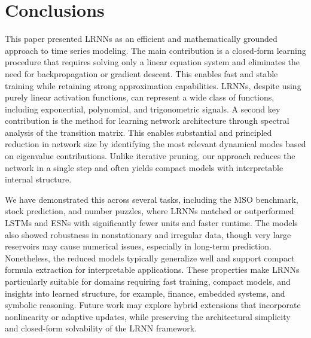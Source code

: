 \documentclass{sn-jnl}
\theoremstyle{definition}
\begin{document}
\section{Conclusions}\label{conclude}

This paper presented LRNNs as an efficient and mathematically grounded approach
to time series modeling. The main contribution is a closed-form learning
procedure that requires solving only a linear equation system and eliminates the
need for backpropagation or gradient descent. This enables fast and stable
training while retaining strong approximation capabilities. LRNNs, despite using
purely linear activation functions, can represent a wide class of functions,
including exponential, polynomial, and trigonometric signals. A second key
contribution is the method for learning network architecture through spectral
analysis of the transition matrix. This enables substantial and principled
reduction in network size by identifying the most relevant dynamical modes based
on eigenvalue contributions. Unlike iterative pruning, our approach reduces the
network in a single step and often yields compact models with interpretable
internal structure.

We have demonstrated this across several tasks, including the MSO benchmark,
stock prediction, and number puzzles, where LRNNs matched or outperformed LSTMs
and ESNs with significantly fewer units and faster runtime. The models also
showed robustness in nonstationary and irregular data, though very large
reservoirs may cause numerical issues, especially in long-term prediction.
Nonetheless, the reduced models typically generalize well and support compact
formula extraction for interpretable applications. These properties make LRNNs
particularly suitable for domains requiring fast training, compact models, and
insights into learned structure, for example, finance, embedded systems, and
symbolic reasoning. Future work may explore hybrid extensions that incorporate
nonlinearity or adaptive updates, while preserving the architectural simplicity
and closed-form solvability of the LRNN framework.

\end{document}
